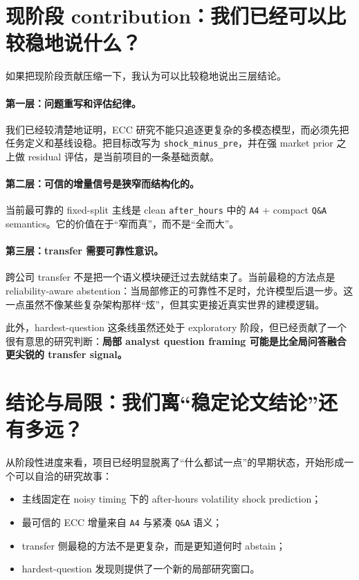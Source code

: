 \documentclass[11pt]{ctexart}
\begin{document}
\section{现阶段 contribution：我们已经可以比较稳地说什么？}
如果把现阶段贡献压缩一下，我认为可以比较稳地说出三层结论。

\paragraph{第一层：问题重写和评估纪律。}
我们已经较清楚地证明，ECC 研究不能只追逐更复杂的多模态模型，而必须先把任务定义和基线设稳。把目标改写为 \texttt{shock\_minus\_pre}，并在强 market prior 之上做 residual 评估，是当前项目的一条基础贡献。

\paragraph{第二层：可信的增量信号是狭窄而结构化的。}
当前最可靠的 fixed-split 主线是 clean \texttt{after\_hours} 中的 \texttt{A4} + compact \texttt{Q\&A} semantics。它的价值在于“窄而真”，而不是“全而大”。

\paragraph{第三层：transfer 需要可靠性意识。}
跨公司 transfer 不是把一个语义模块硬迁过去就结束了。当前最稳的方法点是 reliability-aware abstention：当局部修正的可靠性不足时，允许模型后退一步。这一点虽然不像某些复杂架构那样“炫”，但其实更接近真实世界的建模逻辑。

此外，hardest-question 这条线虽然还处于 exploratory 阶段，但已经贡献了一个很有意思的研究判断：\textbf{局部 analyst question framing 可能是比全局问答融合更尖锐的 transfer signal。}

\section{结论与局限：我们离“稳定论文结论”还有多远？}
从阶段性进度来看，项目已经明显脱离了“什么都试一点”的早期状态，开始形成一个可以自洽的研究故事：
\begin{itemize}
    \item 主线固定在 noisy timing 下的 after-hours volatility shock prediction；
    \item 最可信的 ECC 增量来自 \texttt{A4} 与紧凑 \texttt{Q\&A} 语义；
    \item transfer 侧最稳的方法不是更复杂，而是更知道何时 abstain；
    \item hardest-question 发现则提供了一个新的局部研究窗口。
\end{itemize}
\end{document}
